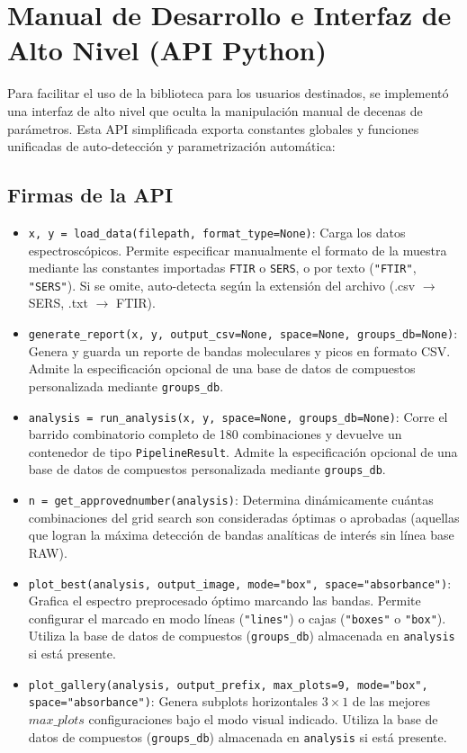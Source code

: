 \section{Manual de Desarrollo e Interfaz de Alto Nivel (API Python)}
Para facilitar el uso de la biblioteca para los usuarios destinados, se implementó una interfaz de alto nivel que oculta la manipulación manual de decenas de parámetros. Esta API simplificada exporta constantes globales y funciones unificadas de auto-detección y parametrización automática:

\subsection{Firmas de la API}
\begin{itemize}
    \item \texttt{x, y = load\_data(filepath, format\_type=None)}: Carga los datos espectroscópicos. Permite especificar manualmente el formato de la muestra mediante las constantes importadas \texttt{FTIR} o \texttt{SERS}, o por texto (\texttt{"FTIR"}, \texttt{"SERS"}). Si se omite, auto-detecta según la extensión del archivo (.csv $\rightarrow$ SERS, .txt $\rightarrow$ FTIR).
    \item \texttt{generate\_report(x, y, output\_csv=None, space=None, groups\_db=None)}: Genera y guarda un reporte de bandas moleculares y picos en formato CSV. Admite la especificación opcional de una base de datos de compuestos personalizada mediante \texttt{groups\_db}.
    \item \texttt{analysis = run\_analysis(x, y, space=None, groups\_db=None)}: Corre el barrido combinatorio completo de 180 combinaciones y devuelve un contenedor de tipo \texttt{PipelineResult}. Admite la especificación opcional de una base de datos de compuestos personalizada mediante \texttt{groups\_db}.
    \item \texttt{n = get\_approvednumber(analysis)}: Determina dinámicamente cuántas combinaciones del grid search son consideradas óptimas o aprobadas (aquellas que logran la máxima detección de bandas analíticas de interés sin línea base RAW).
    \item \texttt{plot\_best(analysis, output\_image, mode="box", space="absorbance")}: Grafica el espectro preprocesado óptimo marcando las bandas. Permite configurar el marcado en modo líneas (\texttt{"lines"}) o cajas (\texttt{"boxes"} o \texttt{"box"}). Utiliza la base de datos de compuestos (\texttt{groups\_db}) almacenada en \texttt{analysis} si está presente.
    \item \texttt{plot\_gallery(analysis, output\_prefix, max\_plots=9, mode="box", space="absorbance")}: Genera subplots horizontales $3 \times 1$ de las mejores $max\_plots$ configuraciones bajo el modo visual indicado. Utiliza la base de datos de compuestos (\texttt{groups\_db}) almacenada en \texttt{analysis} si está presente.
\end{itemize}

